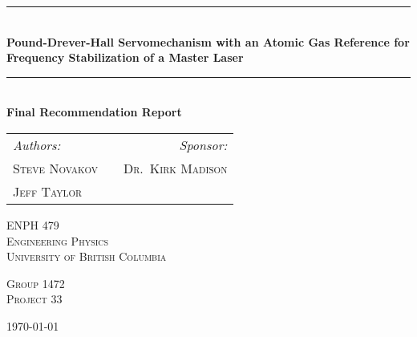 \documentclass[10.5pt, a4paper, twoside]{article}
\newcommand{\HRule}{\rule{\linewidth}{0.5mm}}
\begin{document}
%
%

\begin{titlepage}
\begin{center}


\HRule \\[0.4cm]
{ \huge \bfseries Pound-Drever-Hall Servomechanism with an Atomic Gas Reference for Frequency Stabilization of a Master Laser \\[0.4cm] }

\HRule \\[1.3cm]

{ \huge \bfseries Final Recommendation Report \\[1.3cm] }


\begin{tabularx}{\linewidth}{lXr}
  \Large \emph{Authors:} & & \Large \emph{Sponsor:} \\
  \Large \textsc{Steve Novakov} & & \Large \textsc{Dr.~Kirk Madison} \\
  \Large \textsc{Jeff Taylor}  & & \\
\end{tabularx}

\vfill

\textsc{\LARGE ENPH 479}\\[0.3cm]
\textsc{\LARGE Engineering Physics}\\[0.3cm]
\textsc{\LARGE University of British Columbia}\\[0.3cm]

\vfill

\textsc{\Large Group 1472}\\[0.3cm]
\textsc{\Large Project 33}\\[0.3cm]

\vfill

{\large \today}

\end{center}
\end{titlepage}
\newpage
\end{document}
